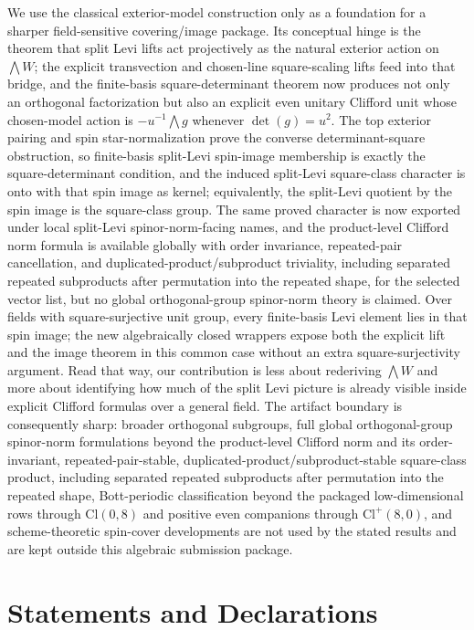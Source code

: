 \documentclass{birkjour}
\theoremstyle{plain}
\theoremstyle{definition}
\theoremstyle{remark}
\newcommand{\Cl}{\mathrm{Cl}}
\begin{document}
We use the classical exterior-model construction only as a foundation
for a sharper field-sensitive covering/image package. Its conceptual hinge is
the theorem that split Levi lifts act projectively as the natural exterior
action on $\bigwedge W$; the explicit transvection and chosen-line square-scaling
lifts feed into that bridge, and the finite-basis square-determinant theorem now
produces not only an orthogonal factorization but also an explicit even unitary
Clifford unit whose chosen-model action is $-u^{-1}\bigwedge g$ whenever
$\det(g)=u^2$. The top exterior pairing and spin star-normalization prove the
converse determinant-square obstruction, so finite-basis split-Levi spin-image
membership is exactly the square-determinant condition, and the induced
split-Levi square-class character is onto with that spin image as kernel; equivalently, the
split-Levi quotient by the spin image is the square-class group. The same proved
character is now exported under local split-Levi spinor-norm-facing names, and
the product-level Clifford norm formula is available globally with order
invariance, repeated-pair cancellation, and duplicated-product/subproduct
triviality, including separated repeated subproducts after permutation into the
repeated shape, for the selected vector list, but no global orthogonal-group
spinor-norm theory is claimed. Over fields with
square-surjective unit group, every finite-basis Levi element lies in that spin
image; the new algebraically closed wrappers expose both the explicit lift and
the image theorem in this common case without an extra square-surjectivity
argument. Read that way, our contribution is less about rederiving
$\bigwedge W$ and more about identifying how much of the split Levi picture is
already visible inside explicit Clifford formulas over a general field. The
artifact boundary is consequently sharp: broader orthogonal subgroups, full
global orthogonal-group spinor-norm formulations beyond the product-level
Clifford norm and its order-invariant, repeated-pair-stable,
duplicated-product/subproduct-stable square-class product, including separated
repeated subproducts after permutation into the repeated shape, Bott-periodic
classification beyond the packaged low-dimensional rows through $\Cl(0,8)$ and positive even companions
through $\Cl^+(8,0)$, and scheme-theoretic
spin-cover developments are not used by the stated results and are kept outside
this algebraic submission package.

\section*{Statements and Declarations}
\end{document}
